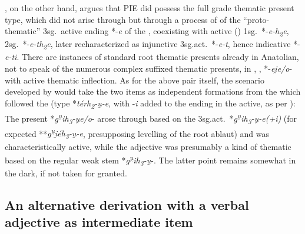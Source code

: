 \documentclass[output=paper,colorlinks,citecolor=brown]{langscibook}
\begin{document}
\citet[74--77]{Jasanoff2023}, on the other hand, argues that PIE did possess the full grade thematic present type, which did not arise through  but through a process of  of the “proto-thematic” 3sg.\ active ending *-\textit{e} of the , coexisting with active () 1sg.\ *-\textit{e-h\textsubscript{2}e}, 2sg.\  *-\textit{e-th\textsubscript{2}e}, later recharacterized as injunctive 3sg.act.\ *-\textit{e-t}, hence indicative *-\textit{e-ti}. There are instances of standard root thematic presents already in Anatolian, not to speak of the numerous complex suffixed thematic presents, in , , *-\textit{ei̯e/o}- with active thematic inflection. As for the above pair itself, the scenario developed by \citet[62--71]{Jasanoff2023} would take the two items as independent formations from the   which followed the  (type  *\textit{térh\textsubscript{2}-u̯\nobreakdash-e}, with -\textit{i} added to the ending in the active, as per \citealt[141--143]{Jasanoff2003}): The present   *\textit{g\textsuperscript{u̯}ih\textsubscript{3}-u̯e/o}- arose through  based on the 3sg.act.\ *\textit{g\textsuperscript{u̯}ih\textsubscript{3}-u̯-e(+i)} (for expected **\textit{g\textsuperscript{u̯}i̯éh\textsubscript{3}-u̯-e}, presupposing levelling of the root ablaut) and was characteristically active, while the adjective was presumably a kind of thematic  based on the regular weak stem *\textit{g\textsuperscript{u̯}ih\textsubscript{3}-u̯}-.  The latter point remains somewhat in the dark, if not taken for granted. 

\subsection{An alternative derivation with a verbal adjective as intermediate item}
\label{sec:altder}
\end{document}
